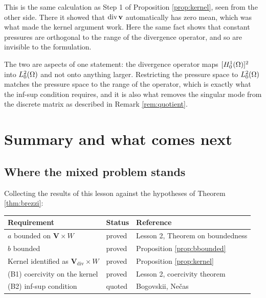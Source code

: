 \documentclass[11pt,a4paper]{article}
\newcommand{\Vdiv}{\mathbf{V}_{\mathrm{div}}}
\newcommand{\Vsp}{\mathbf{V}}
\newcommand{\Wsp}{W}
\begin{document}
\begin{remark}
This is the same calculation as Step 1 of Proposition \ref{prop:kernel}, seen
from the other side. There it showed that $\operatorname{div} \mathbf{v}$ automatically has zero
mean, which was what made the kernel argument work. Here the same fact shows
that constant pressures are orthogonal to the range of the divergence operator,
and so are invisible to the formulation.

The two are aspects of one statement: the divergence operator maps
$[H^{1}_{0}(\Omega)]^{2}$ into $L^{2}_{0}(\Omega)$ and not onto anything larger. Restricting the
pressure space to $L^{2}_{0}(\Omega)$ matches the pressure space to the range of the
operator, which is exactly what the inf-sup condition requires, and it is also
what removes the singular mode from the discrete matrix as described in Remark
\ref{rem:quotient}.
\end{remark}

\section{Summary and what comes next}

\subsection{Where the mixed problem stands}

Collecting the results of this lesson against the hypotheses of Theorem
\ref{thm:brezzi}:

\begin{center}
\begin{tabular}{@{}lll@{}}
\toprule
Requirement & Status & Reference \\
\midrule
$a$ bounded on $\Vsp\times\Wsp$ & proved & Lesson 2, Theorem on boundedness \\
$b$ bounded & proved & Proposition \ref{prop:bbounded} \\
Kernel identified as $\Vdiv\times\Wsp$ & proved & Proposition \ref{prop:kernel} \\
(B1) coercivity on the kernel & proved & Lesson 2, coercivity theorem \\
(B2) inf-sup condition & quoted & Bogovskii, Ne\v{c}as \\
\bottomrule
\end{tabular}
\end{center}
\end{document}
